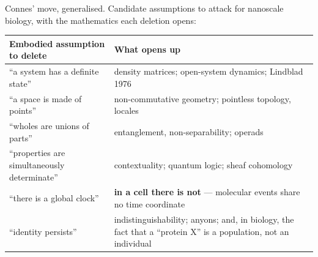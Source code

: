 \begin{movebox}[title={MOVE 2 --- Delete the offending assumption, keep the inference}]
Connes' move, generalised. Candidate assumptions to attack for nanoscale biology, with the
mathematics each deletion opens:
\begin{center}\small
\begin{tabular}{@{}>{\raggedright\arraybackslash}p{7.3cm}>{\raggedright\arraybackslash}p{8.9cm}@{}}
\toprule
\rowcolor{bio!12}
\textbf{\color{bio}Embodied assumption to delete} & \textbf{\color{bio}What opens up}\\
\midrule
``a system has a definite state''        & density matrices; open-system dynamics; Lindblad 1976\\
``a space is made of points''            & non-commutative geometry; pointless topology, locales\\
``wholes are unions of parts''           & entanglement, non-separability; operads\\
``properties are simultaneously determinate'' & contextuality; quantum logic; sheaf cohomology\\
\rowcolor{bio!6}
``there is a global clock''              & \textbf{in a cell there is not} --- molecular events share no time coordinate\\
\rowcolor{bio!6}
``identity persists''                    & indistinguishability; anyons; and, in biology, the fact that a ``protein X'' is a population, not an individual\\
\bottomrule
\end{tabular}
\end{center}
\end{movebox}

